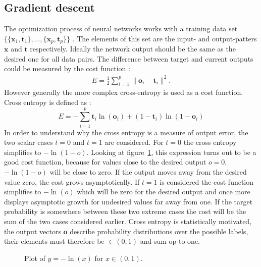 \subsection{Gradient descent}
The optimization process of neural networks works with a training data set $\{\{\mathbf{x}_1,\mathbf{t}_1\}, \dots , \{\mathbf{x}_p,\mathbf{t}_p\} \}$ \cite[page 156]{Rojas1996}. The elements of this set are the input- and output-patters $\mathbf{x}$ and $\mathbf{t}$ respectively. Ideally the network output should be the same as the desired one for all data pairs. The difference between target and current outputs could be measured by the cost function \cite[page 156]{Rojas1996}:
\begin{align}
E = \frac{1}{2}\sum\limits_{i=1}^{p} \| \mathbf{o}_i - \mathbf{t}_i \|^2.
\end{align}
However generally the more complex cross-entropy is used as a cost function. Cross entropy is defined as \cite[page 245]{Bishop1995}:
\begin{equation}
E = - \sum\limits_{i=1}^{p} {\mathbf{t}_i \ln(\mathbf{o}_i)} + (1 - \mathbf{t}_i)\ln(1 - \mathbf{o}_i)
\label{eq:corssEntropy}
\end{equation}
In order to understand why the cross entropy is a measure of output error, the two scalar cases $t=0$ and $t=1$ are considered. For $t = 0$ the cross entropy simplifies to $-\ln(1 - o)$. Looking at figure~\ref{fig:logPlot}, this expression turns out to be a good cost function, because for values close to the desired output $o = 0$, $-\ln(1 - o)$ will be close to zero. If the output moves away from the desired value zero, the cost grows asymptotically. If $t = 1$ is considered the cost function simplifies to $-\ln(o)$ which will be zero for the desired output and once more displays asymptotic growth for undesired values far away from one. If the target probability is somewhere between these two extreme cases the cost will be the sum of the two cases considered earlier. Cross entropy is statistically motivated, the output vectors $\mathbf{o}$ describe probability distributions over the possible labels, their elements must therefore be $\in (0,1)$ and sum op to one.
\begin{figure}
\centering

\caption{Plot of $y = -\ln(x)$ for $x \in (0,1)$.}
\label{fig:logPlot}
\end{figure}

